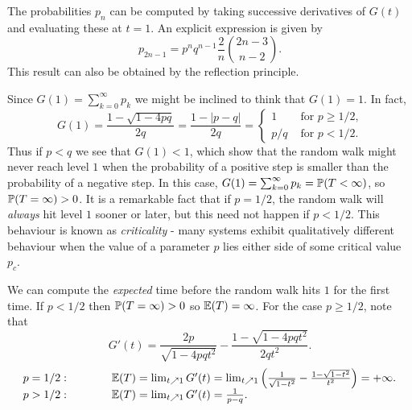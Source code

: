 \begin{remark}
The probabilities $p_n$ can be computed by taking successive derivatives of $G(t)$ and evaluating these at $t=1$. An explicit expression is given by
\[
p_{2n-1} = p^n q^{n-1}\frac{2}{n}\binom{2n-3}{n-2}.
\]
This result can also be obtained by the reflection principle. 
\end{remark}

\begin{remark}
Since $G(1)=\sum_{k=0}^{\infty}p_k$ we might be inclined to think that $G(1)=1$. In fact,
\[
G(1) = \frac{1 - \sqrt{1-4pq}}{2q} = \frac{1-|p-q|}{2q} 
	= \begin{cases} 
		1 	& \text{ for $p\geq 1/2$,} \\
		p/q & \text{ for $p < 1/2$.}
	\end{cases}
\]
Thus if $p<q$ we see that $G(1)<1$, which show that the random walk might never reach level $1$ when the probability of a positive step is smaller than the probability of a negative step. In this case, $G(1)=\sum_{k=0}^{\infty}p_k = \mathbb{P}(T<\infty)$, so $\mathbb{P}(T=\infty)>0$. It is a remarkable fact that if $p=1/2$, the random walk will \emph{always} hit level $1$ sooner or later, but this need not happen if $p<1/2$. This behaviour is known as \emph{criticality} -  many systems exhibit qualitatively different behaviour when the value of a parameter $p$ lies either side of some critical value $p_c$.
\end{remark}

\begin{remark}
We can compute the \emph{expected} time before the random walk hits $1$ for the first time. If $p<1/2$ then $\mathbb{P}(T=\infty)>0$ so $\mathbb{E}(T)=\infty$. For the case $p\geq 1/2$, note that
\[
G'(t) = \frac{2p}{\sqrt{1-4pqt^2}} - \frac{1-\sqrt{1-4pqt^2}}{2qt^2}.
\]
\[
\begin{array}{lcl}
p=1/2:	& \qquad	& \mathbb{E}(T) = \lim_{t\nearrow 1}G'(t)	= \lim_{t\nearrow 1}\left(\frac{1}{\sqrt{1-t^2}} - \frac{1-\sqrt{1-t^2}}{t^2}\right) = +\infty. \\
p>1/2:	&			& \mathbb{E}(T) = \lim_{t\nearrow 1}G'(t) = \frac{1}{p-q}.
\end{array}
\]
\end{remark}

